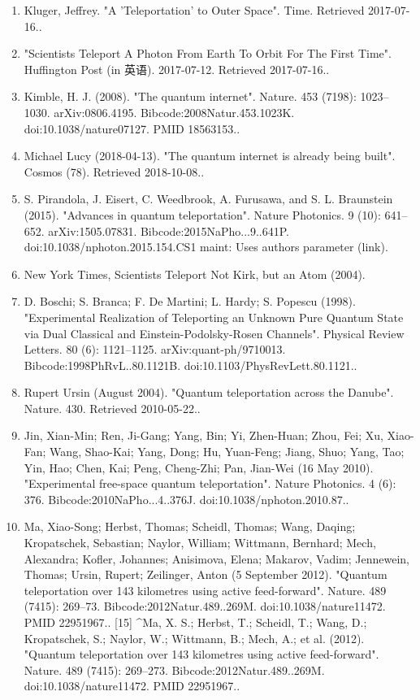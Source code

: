 \begin{enumerate}
\item Kluger, Jeffrey. "A 'Teleportation' to Outer Space". Time. Retrieved 2017-07-16..
\item "Scientists Teleport A Photon From Earth To Orbit For The First Time". Huffington Post (in 英语). 2017-07-12. Retrieved 2017-07-16..
\item Kimble, H. J. (2008). "The quantum internet". Nature. 453 (7198): 1023–1030. arXiv:0806.4195. Bibcode:2008Natur.453.1023K. doi:10.1038/nature07127. PMID 18563153..
\item Michael Lucy (2018-04-13). "The quantum internet is already being built". Cosmos (78). Retrieved 2018-10-08..
\item S. Pirandola, J. Eisert, C. Weedbrook, A. Furusawa, and S. L. Braunstein (2015). "Advances in quantum teleportation". Nature Photonics. 9 (10): 641–652. arXiv:1505.07831. Bibcode:2015NaPho...9..641P. doi:10.1038/nphoton.2015.154.CS1 maint: Uses authors parameter (link).
\item New York Times, Scientists Teleport Not Kirk, but an Atom (2004).
\item D. Boschi; S. Branca; F. De Martini; L. Hardy; S. Popescu (1998). "Experimental Realization of Teleporting an Unknown Pure Quantum State via Dual Classical and Einstein-Podolsky-Rosen Channels". Physical Review Letters. 80 (6): 1121–1125. arXiv:quant-ph/9710013. Bibcode:1998PhRvL..80.1121B. doi:10.1103/PhysRevLett.80.1121..
\item Rupert Ursin (August 2004). "Quantum teleportation across the Danube". Nature. 430. Retrieved 2010-05-22..
\item Jin, Xian-Min; Ren, Ji-Gang; Yang, Bin; Yi, Zhen-Huan; Zhou, Fei; Xu, Xiao-Fan; Wang, Shao-Kai; Yang, Dong; Hu, Yuan-Feng; Jiang, Shuo; Yang, Tao; Yin, Hao; Chen, Kai; Peng, Cheng-Zhi; Pan, Jian-Wei (16 May 2010). "Experimental free-space quantum teleportation". Nature Photonics. 4 (6): 376. Bibcode:2010NaPho...4..376J. doi:10.1038/nphoton.2010.87..
\item Ma, Xiao-Song; Herbst, Thomas; Scheidl, Thomas; Wang, Daqing; Kropatschek, Sebastian; Naylor, William; Wittmann, Bernhard; Mech, Alexandra; Kofler, Johannes; Anisimova, Elena; Makarov, Vadim; Jennewein, Thomas; Ursin, Rupert; Zeilinger, Anton (5 September 2012). "Quantum teleportation over 143 kilometres using active feed-forward". Nature. 489 (7415): 269–73. Bibcode:2012Natur.489..269M. doi:10.1038/nature11472. PMID 22951967..
[15]
^Ma, X. S.; Herbst, T.; Scheidl, T.; Wang, D.; Kropatschek, S.; Naylor, W.; Wittmann, B.; Mech, A.; et al. (2012). "Quantum teleportation over 143 kilometres using active feed-forward". Nature. 489 (7415): 269–273. Bibcode:2012Natur.489..269M. doi:10.1038/nature11472. PMID 22951967..

\end{enumerate}

